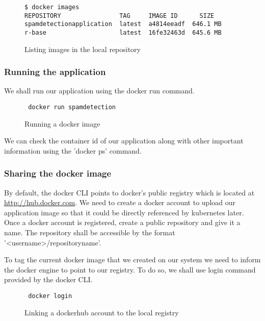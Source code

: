 \documentclass[9pt,twocolumn,twoside]{../../styles/osajnl}
\begin{document}
\begin{figure}[H]
\begin{verbatim}
$ docker images
REPOSITORY                TAG     IMAGE ID      SIZE
spamdetectionapplication  latest  a4814eeadf  646.1 MB
r-base                    latest  16fe32463d  645.6 MB
\end{verbatim}                   
\caption{Listing images in the local repository}
\label{Listing images in the local repository}
\end{figure}

\subsubsection{Running the application}

We shall run our application using the docker run command.

\begin{figure}[H]
\begin{verbatim}
 docker run spamdetection
\end{verbatim}
\caption{Running a docker image}
\label{Running a docker image}
\end{figure}

We can check the container id of our application along with other
important information using the 'docker ps' command.
 
\subsubsection{Sharing the docker image}

By default, the docker CLI points to docker's public registry which is
located at \url{http://hub.docker.com}. We need to create a docker
account to upload our application image so that it could be directly
referenced by kubernetes later. Once a docker account is registered,
create a public repository and give it a name. The repository shall be
accessible by the format '<username>/repositoryname'.

To tag the current docker image that we created on our system we need
to inform the docker engine to point to our registry. To do so, we
shall use login command provided by the docker CLI.

\begin{figure}[H]
\begin{verbatim}
 docker login
\end{verbatim}
\caption{Linking a dockerhub account to the local registry}
\label{Linking a dockerhub account to the local registry}
\end{figure}
\end{document}
